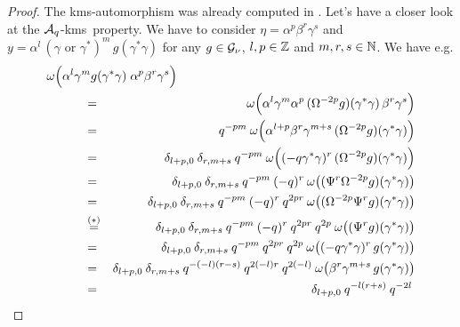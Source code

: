 \begin{proof}
The {\sc kms}-automorphism was already computed in \cite{Koelink:thesis,Koelink:QE2}\@.
Let's have a closer look at the ${\mathcal A}_q$-{\sc kms}\ property.
We have to consider $\eta = \alpha^p \beta^r \gamma^s$ and
$y = \alpha^l \, (\gamma \mbox{ or } \gamma^*)^m \, g(\gamma^*\gamma)$
for any $g\in \mathcal G_\nu$, $l,p \in \mathbb{Z}$ and $m,r,s \in \mathbb{N}$.
We have e.g.
\begin{eqnarray*}
\lefteqn{\omega \!\left( \alpha^l \gamma^m  g(\gamma^*\gamma) \;
            \alpha^p \beta^r \gamma^s \vertL \right)} \\
&\hspace{3em}=& \omega \!\left( \alpha^l \gamma^m \alpha^p
\,(\Omega^{-2p}g)(\gamma^*\gamma)\,
             \beta^r \gamma^s \vertL \right)  \\
&\hspace{3em}=& q^{-pm} \: \omega \!\left( \alpha^{l+p} \beta^r \gamma^{m+s}
           \,(\Omega^{-2p}g)(\gamma^*\gamma) \vertL \right)  \\
&\hspace{3em}=& \delta_{l+p,0} \: \delta_{r,m+s} \: q^{-pm} \: \omega \!\left((-q
\gamma^* \gamma)^r
           \,(\Omega^{-2p}g)(\gamma^*\gamma) \vertL \right)  \\
&\hspace{3em}=& \delta_{l+p,0} \: \delta_{r,m+s} \: q^{-pm} \: (-q)^r \:
\omega \!\left(
           (\Psi^r \Omega^{-2p}g)(\gamma^*\gamma) \vertM \right)  \\
&\hspace{3em}=& \delta_{l+p,0} \: \delta_{r,m+s} \: q^{-pm} \: (-q)^r \:
q^{2pr}\: \omega \!\left(
           (\Omega^{-2p}\Psi^r g)(\gamma^*\gamma) \vertM \right)  \\
&\hspace{3em}\stackrel{(*)}{=}& \delta_{l+p,0} \: \delta_{r,m+s} \: q^{-pm} \:
(-q)^r \: q^{2pr}\:
        q^{2p}\: \omega \!\left((\Psi^r g)(\gamma^*\gamma) \vertM \right)  \\
&\hspace{3em}=& \delta_{l+p,0} \: \delta_{r,m+s} \: q^{-pm} \:  q^{2pr}\:
        q^{2p}\: \omega \!\left( (-q \gamma^* \gamma)^r\, g(\gamma^*\gamma) \vertM \right)  \\
&\hspace{3em}=& \delta_{l+p,0} \: \delta_{r,m+s} \: q^{-(-l)(r-s)} \:
q^{2(-l)r}\:
        q^{2(-l)}\: \omega \!\left( \beta^r \gamma^{m+s} \, g(\gamma^*\gamma) \vertM \right)  \\
&\hspace{3em}=& \delta_{l+p,0} \:  q^{-l(r+s)}\: q^{-2l}\:

\end{eqnarray*}
\end{proof}
